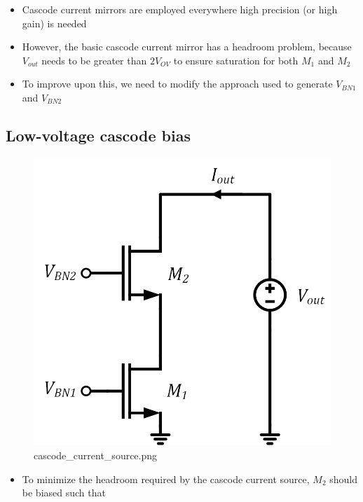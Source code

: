\documentclass[11pt]{article}
\providecommand{\tightlist}{%
      \setlength{\itemsep}{0pt}\setlength{\parskip}{0pt}}
\begin{document}
    \begin{itemize}
\item
  Cascode current mirrors are employed everywhere high precision (or
  high gain) is needed
\item
  However, the basic cascode current mirror has a headroom problem,
  because \(V_{out}\) needs to be greater than \(2V_{OV}\) to ensure
  saturation for both \(M_1\) and \(M_2\)
\item
  To improve upon this, we need to modify the approach used to generate
  \(V_{BN1}\) and \(V_{BN2}\)
\end{itemize}

    \hypertarget{low-voltage-cascode-bias}{%
\subsection{Low-voltage cascode bias}\label{low-voltage-cascode-bias}}

    \begin{figure}
\centering
\includegraphics{cascode_current_source.png}
\caption{cascode\_current\_source.png}
\end{figure}

    \begin{itemize}
\tightlist
\item
  To minimize the headroom required by the cascode current source,
  \(M_2\) should be biased such that
\end{itemize}
\end{document}
